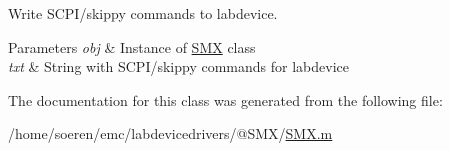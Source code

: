 Write S\+C\+P\+I/skippy commands to labdevice. 


\begin{DoxyParams}{Parameters}
{\em obj} & Instance of \hyperlink{class_s_m_x}{S\+MX} class \\
\hline
{\em txt} & String with S\+C\+P\+I/skippy commands for labdevice \\
\hline
\end{DoxyParams}


The documentation for this class was generated from the following file\+:\begin{DoxyCompactItemize}
\item 
/home/soeren/emc/labdevicedrivers/@\+S\+M\+X/\hyperlink{_s_m_x_8m}{S\+M\+X.\+m}\end{DoxyCompactItemize}

